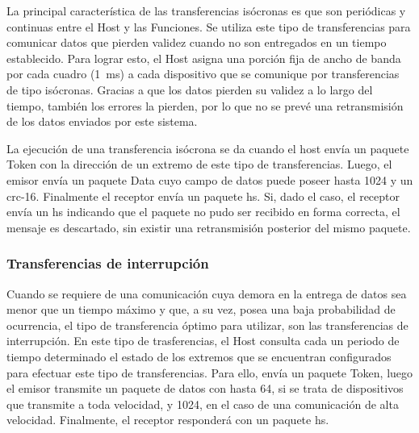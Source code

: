 	La principal característica de las transferencias isócronas es que son periódicas y continuas entre el Host y las Funciones. Se utiliza este tipo de transferencias para comunicar datos que pierden validez cuando no son entregados en un tiempo establecido. Para lograr esto, el Host asigna una porción fija de ancho de banda por cada cuadro (\SI{1}{\milli\second}) a cada dispositivo que se comunique por transferencias de tipo isócronas. Gracias a que los datos pierden su validez a lo largo del tiempo, también los errores la pierden, por lo que no se prevé una retransmisión de los datos enviados por este sistema.%
	
	La ejecución de una transferencia isócrona se da cuando el host envía un paquete Token con la dirección de un extremo de este tipo de transferencias. Luego, el emisor envía un paquete Data cuyo campo de datos puede poseer hasta \SI{1024}{\byte} y un \acrshort{crc}-16. Finalmente el receptor envía un paquete \acrshort{hs}. Si, dado el caso, el receptor envía un \acrshort{hs} indicando que el paquete no pudo ser recibido en forma correcta, el mensaje es descartado, sin existir una retransmisión posterior del mismo paquete.
	
\subsubsection{Transferencias de interrupción}
	Cuando se requiere de una comunicación cuya demora en la entrega de datos sea menor que un tiempo máximo y que, a su vez, posea una baja probabilidad de ocurrencia, el tipo de transferencia óptimo para utilizar, son las transferencias de interrupción. En este tipo de trasferencias, el Host consulta cada un periodo de tiempo determinado el estado de los extremos que se encuentran configurados para efectuar este tipo de transferencias. Para ello, envía un paquete Token, luego el emisor transmite un paquete de datos con hasta \SI{64}{\byte}, si se trata de dispositivos que transmite a toda velocidad, y \SI{1024}{\byte}, en el caso de una comunicación de alta velocidad. Finalmente, el receptor responderá con un paquete \acrshort{hs}.
